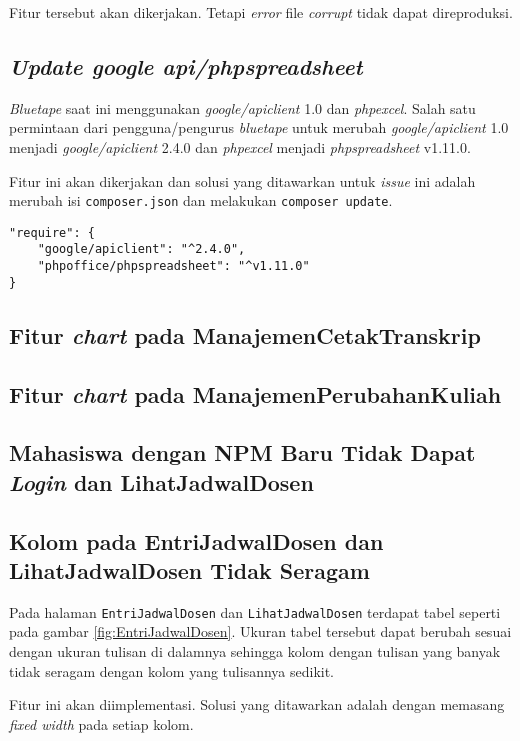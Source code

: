 Fitur tersebut akan dikerjakan. Tetapi \textit{error} file \textit{corrupt} tidak dapat direproduksi.

\subsection{\textit{Update google api/phpspreadsheet}}
\label{issue:2}
\textit{Bluetape} saat ini menggunakan \textit{google/apiclient} 1.0 dan \textit{phpexcel}. Salah satu permintaan dari pengguna/pengurus \textit{bluetape} untuk merubah \textit{google/apiclient} 1.0 menjadi \textit{google/apiclient} 2.4.0 dan \textit{phpexcel} menjadi \textit{phpspreadsheet} v1.11.0. 

Fitur ini akan dikerjakan dan solusi yang ditawarkan untuk \textit{issue} ini adalah merubah isi \texttt{composer.json} dan melakukan \texttt{composer update}.
\begin{lstlisting}
"require": {
	"google/apiclient": "^2.4.0",
	"phpoffice/phpspreadsheet": "^v1.11.0"
}
\end{lstlisting}

\subsection{Fitur \textit{chart} pada ManajemenCetakTranskrip}
\label{issue:3}

\subsection{Fitur \textit{chart} pada ManajemenPerubahanKuliah}
\label{issue:4}
\subsection{Mahasiswa dengan NPM Baru Tidak Dapat \textit{Login} dan LihatJadwalDosen}
\label{issue:5}
\subsection{Kolom pada EntriJadwalDosen dan LihatJadwalDosen Tidak Seragam}
\label{issue:6} 
Pada halaman \texttt{EntriJadwalDosen} dan \texttt{LihatJadwalDosen} terdapat tabel seperti pada gambar \ref{fig:EntriJadwalDosen}. Ukuran tabel tersebut dapat berubah sesuai dengan ukuran tulisan di dalamnya sehingga kolom dengan tulisan yang banyak tidak seragam dengan kolom yang tulisannya sedikit.

Fitur ini akan diimplementasi. Solusi yang ditawarkan adalah dengan memasang \textit{fixed width} pada setiap kolom.


